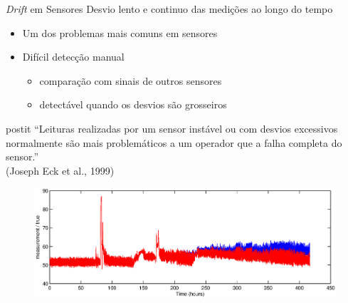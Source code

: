 \documentclass{beamer}
\begin{document}
\begin{frame}{\textit{Drift} em Sensores}
    Desvio lento e continuo das medições ao longo do tempo

    \begin{itemize}
        \item Um dos problemas mais comuns em sensores
        \item Difícil detecção manual
            \begin{itemize}
                \item comparação com sinais de outros sensores
                \item detectável quando os desvios são grosseiros
            \end{itemize}
    \end{itemize}

    \begin{beamercolorbox}[sep=5pt]{postit}
        ``Leituras realizadas por um sensor instável ou com desvios excessivos
        normalmente são mais problemáticos a um operador que a falha completa do
        sensor.''\\ \footnotesize(Joseph Eck et al., 1999)
    \end{beamercolorbox}

    \begin{figure}[!htb]
        \centering
        \includegraphics[trim=0pt 0pt 0cm 15pt,clip=true,width=\textwidth]{figuras/drift.eps}
    \end{figure}

\end{frame}
\end{document}
